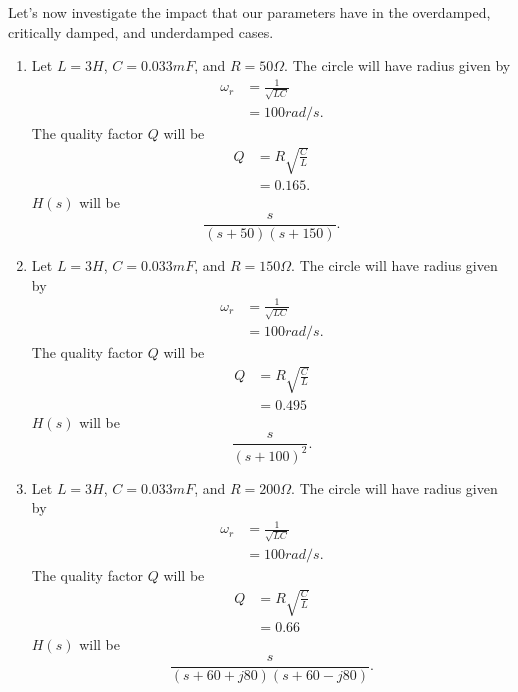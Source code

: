 \documentclass[nobib]{tufte-handout}
\begin{document}
Let's now investigate the impact that 
our parameters have in the overdamped, 
critically damped, and underdamped cases. 
\begin{enumerate}
    \item Let $L = 3 H$, $C = 0.033 mF$, 
    and $R = 50\Omega$. The circle 
    will have radius given by 
    \begin{align}
        \omega_r &= \frac{1}{\sqrt{LC}} \\
        &= 100 rad/s.
    \end{align}
    The quality factor $Q$ will be
    \begin{align}
        Q &= R \sqrt{\frac{C}{L}} \\
        &= 0.165.
    \end{align}
    $H(s)$ will be 
    \begin{equation}
        \frac{s}{(s + 50)(s + 150)}.
    \end{equation}

    \item Let $L = 3 H$, $C = 0.033 mF$, 
    and $R = 150\Omega$. The circle 
    will have radius given by 
    \begin{align}
        \omega_r &= \frac{1}{\sqrt{LC}} \\
        &= 100 rad/s.
    \end{align}
    The quality factor $Q$ will 
    be
    \begin{align}
        Q &= R \sqrt{\frac{C}{L}} \\
        &= 0.495
    \end{align}
    $H(s)$ will be 
    \begin{equation}
        \frac{s}{(s + 100)^2}.
    \end{equation}

    \item Let $L = 3 H$, $C = 0.033 mF$, 
    and $R = 200\Omega$. The circle 
    will have radius given by 
    \begin{align}
        \omega_r &= \frac{1}{\sqrt{LC}} \\
        &= 100 rad/s.
    \end{align}
    The quality factor $Q$ will 
    be
    \begin{align}
        Q &= R \sqrt{\frac{C}{L}} \\
        &= 0.66
    \end{align}
    $H(s)$ will be 
    \begin{equation}
        \frac{s}{(s + 60 + j80)(s + 60 - j80)}.
    \end{equation}
\end{enumerate}
\end{document}
